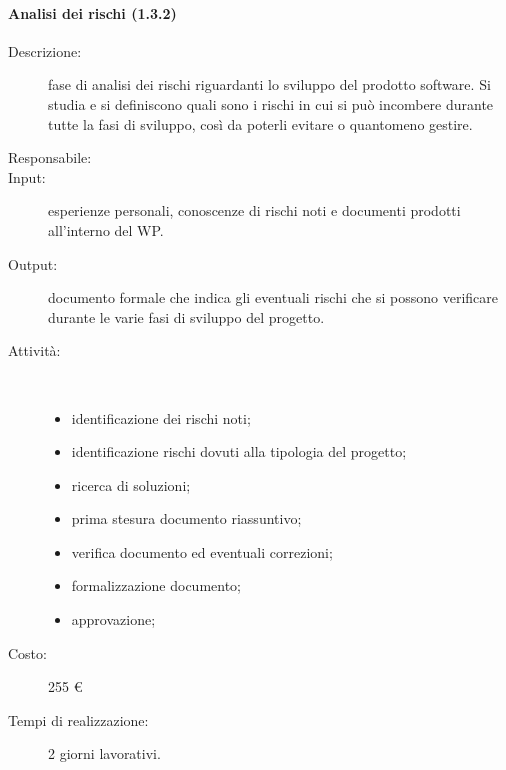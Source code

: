 \begin{description}
\paragraph{Analisi dei rischi (1.3.2)}
\begin{description}
\item[Descrizione:] fase di analisi dei rischi riguardanti lo sviluppo del prodotto software. Si studia e si definiscono quali sono i rischi in cui si pu\`{o} incombere durante tutte la fasi di sviluppo, cos\`{i} da poterli evitare o quantomeno gestire.
\item[Responsabile:] 
\item[Input:] esperienze personali, conoscenze di rischi noti e documenti prodotti all'interno del WP.
\item[Output:] documento formale che indica gli eventuali rischi che si possono verificare durante le varie fasi di sviluppo del progetto.
\item[Attività:]\mbox{}\\[-1.5\baselineskip]
	\begin{itemize}
	\item identificazione dei rischi noti;
	\item identificazione rischi dovuti alla tipologia del progetto;
	\item ricerca di soluzioni;
	\item prima stesura documento riassuntivo;
	\item verifica documento ed eventuali correzioni;
	\item formalizzazione documento;
	\item approvazione;
	\end{itemize}
\item[Costo:] 255 \euro{}
\item[Tempi di realizzazione:] 2 giorni lavorativi.
\end{description}


\end{description}
